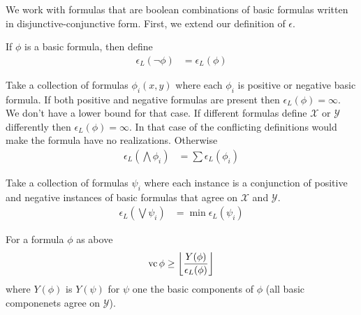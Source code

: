 \documentclass{amsart}
\newcommand{\X}{\mathcal X}
\newcommand{\Y}{\mathcal Y}
\providecommand{\floor}[1]{\left \lfloor #1 \right \rfloor }
\begin{document}
We work with formulas that are boolean combinations of basic formulas written in disjunctive-conjunctive form.
First, we extend our definition of $\epsilon$.

\begin{Definition}[Negation]
	If $\phi$ is a basic formula, then define
	\begin{align*}
		\epsilon_L(\neg \phi) &= \epsilon_L(\phi)
	\end{align*}
\end{Definition}

\begin{Definition}[Conjunction]
	Take a collection of formulas $\phi_i(x, y)$ where each $\phi_i$ is positive or negative basic formula.
	If both positive and negative formulas are present then $\epsilon_L(\phi) = \infty$.
	We don't have a lower bound for that case.
	If different formulas define $\X$ or $\Y$ differently then $\epsilon_L(\phi) = \infty$.
	In that case of the conflicting definitions would make the formula have no realizations.
	Otherwise
	\begin{align*}
		\epsilon_L(\bigwedge \phi_i) &= \sum \epsilon_L(\phi_i)
	\end{align*}
\end{Definition}

\begin{Definition} [Disjunction]
	Take a collection of formulas $\psi_i$ where each instance is a conjunction of positive and negative instances of basic formulas that agree on $\X$ and $\Y$. %
	\begin{align*}
		\epsilon_L(\bigvee \psi_i) &= \min \epsilon_L(\psi_i)
	\end{align*}
\end{Definition}

\begin{Theorem}
	For a formula $\phi$ as above
	\begin{align*}
		\vc \phi \geq \floor{\frac{Y(\phi)}{\epsilon_L(\phi)}}
	\end{align*}
	where $Y(\phi)$ is $Y(\psi)$ for $\psi$ one the basic components of $\phi$ (all basic componenets agree on $\Y$).
\end{Theorem}
\end{document}
